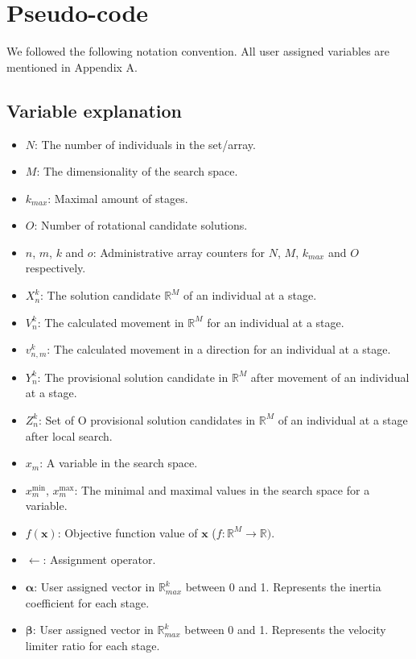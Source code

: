 \documentclass[runningheads]{llncs}
\begin{document}
\section{Pseudo-code}
\label{secPseu}
We followed the following notation convention. All user assigned variables are mentioned in Appendix A.
\subsection{Variable explanation}
\begin{itemize}
    \item $N$: The number of individuals in the set/array.
    \item $M$: The dimensionality of the search space.
    \item $k_{max}$: Maximal amount of stages.
    \item $O$: Number of rotational candidate solutions.
    \item $n$, $m$, $k$ and $o$: Administrative array counters for $N$, $M$, $k_{max}$ and $O$ respectively.
    \item $X_n^k$: The solution candidate $\mathds{R}^M$ of an individual at a stage.
    \item $V_n^k$: The calculated movement in $\mathds{R}^M$ for an individual at a stage.
    \item $v_{n,m}^k$: The calculated movement in a direction for an individual at a stage.
    \item $Y_n^k$: The provisional solution candidate in $\mathds{R}^M$ after movement of an individual at a stage.
    \item $Z_n^{k}$: Set of O provisional solution candidates in $\mathds{R}^M$ of an individual at a stage after local search.
    \item $x_m$: A variable in the search space.
    \item $x_m^{\text{min}}$, $x_m^{\text{max}}$: The minimal and maximal values in the search space for a variable.
    \item $f(\mathbf{x})$: Objective function value of $\mathbf{x}$ ($f: \mathds{R}^M \rightarrow \mathds{R})$.
    \item $\leftarrow$: Assignment operator.
    \item $\boldsymbol{\alpha}$: User assigned vector in $\mathds{R}^k_{max}$ between 0 and 1. Represents the inertia coefficient for each stage.
    \item $\boldsymbol{\beta}$: User assigned vector in $\mathds{R}^k_{max}$ between 0 and 1. Represents the velocity limiter ratio for each stage.

\end{itemize}
\end{document}
